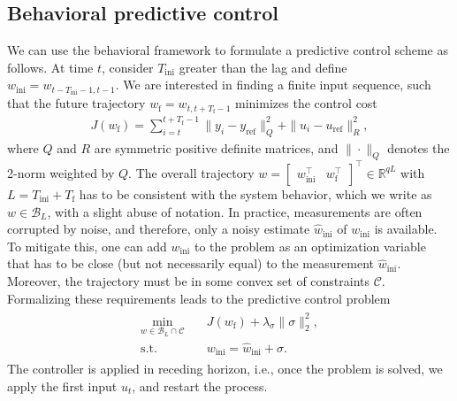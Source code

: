 \documentclass[letterpaper, 10 pt, conference]{ieeeconf}
\begin{document}
\subsection{Behavioral predictive control}
We can use the behavioral framework to formulate a predictive control scheme as follows.
At time $t$, consider $T_\mathrm{ini}$ greater than the lag and define $w_\mathrm{ini} = w_{t-T_\mathrm{ini}-1,t-1}$.
We are interested in finding a finite input sequence, such that the future trajectory $w_\mathrm{f} = w_{t,t+T_\mathrm{f}-1}$ minimizes the control cost
\begin{align*}
    J(w_\mathrm{f}) = \sum_{i=t}^{t+T_\mathrm{f}-1} \|y_i - y_\mathrm{ref}\|_Q^2 + \|u_i - u_\mathrm{ref}\|_R^2,
\end{align*}
where $Q$ and $R$ are symmetric positive definite matrices, and $\|\cdot\|_Q$ denotes the 2-norm weighted by $Q$.
The overall trajectory $w = \begin{bmatrix}
    w_\mathrm{ini}^\top & w_\mathrm{f}^\top
\end{bmatrix}^\top\in\mathbb{R}^{qL}$ with $L = T_\mathrm{ini} + T_\mathrm{f}$ has to be consistent with the system behavior, which we write as $w\in\mathcal{B}_L$, with a slight abuse of notation.
In practice, measurements are often corrupted by noise, and therefore, 
only a noisy estimate $\hat{w}_\mathrm{ini}$ of $w_\mathrm{ini}$ is available.
To mitigate this, one can add $w_\mathrm{ini}$ to the problem as an optimization variable that has to be close (but not necessarily equal) to the measurement $\hat{w}_\mathrm{ini}$.
Moreover, the trajectory must be in some convex set of constraints $\mathcal{C}$.
Formalizing these requirements leads to the predictive control problem~\cite{dorfler2022bridging,markovsky2022data}
\begin{align} \label{eq:behavioral_control}
\begin{split}
    \min_{w\in \mathcal{B}_L \cap \mathcal{C}} & \quad  J(w_\mathrm{f}) + \lambda_\sigma \|\sigma\|_2^2, \\
    \mathrm{s.t.} & \quad  w_\mathrm{ini} = \hat{w}_\mathrm{ini} + \sigma.
    \end{split}
\end{align}
The controller is applied in receding horizon, i.e., once the problem is solved, we apply the first input $u_{t}$, and restart the process.
\end{document}
